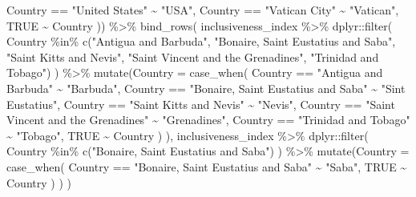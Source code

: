 \documentclass[
]{krantz}
\makeatletter
\newenvironment{Shaded}{\begin{snugshade}}{\end{snugshade}}
\newcommand{\AttributeTok}[1]{\textcolor[rgb]{0.61,0.61,0.61}{#1}}
\newcommand{\ConstantTok}[1]{\textcolor[rgb]{0,0,0}{#1}}
\newcommand{\FunctionTok}[1]{\textcolor[rgb]{0,0,0}{#1}}
\newcommand{\NormalTok}[1]{#1}
\newcommand{\SpecialCharTok}[1]{\textcolor[rgb]{0,0,0}{#1}}
\newcommand{\StringTok}[1]{\textcolor[rgb]{0.5,0.5,0.5}{#1}}
\newenvironment{kframe}{%
\medskip{}
\setlength{\fboxsep}{.8em}
 \def\at@end@of@kframe{}%
 \ifinner\ifhmode%
  \def\at@end@of@kframe{\end{minipage}}%
  \begin{minipage}{\columnwidth}%
 \fi\fi%
 \def\FrameCommand##1{\hskip\@totalleftmargin \hskip-\fboxsep
 \colorbox{shadecolor}{##1}\hskip-\fboxsep
     \hskip-\linewidth \hskip-\@totalleftmargin \hskip\columnwidth}%
 \MakeFramed {\advance\hsize-\width
   \@totalleftmargin\z@ \linewidth\hsize
   \@setminipage}}%
 {\par\unskip\endMakeFramed%
 \at@end@of@kframe}
\renewenvironment{Shaded}{\begin{kframe}}{\end{kframe}}
\makeatother
\begin{document}
\begin{Shaded}
\begin{Highlighting}[]
\NormalTok{    Country }\SpecialCharTok{==} \StringTok{"United States"} \SpecialCharTok{\textasciitilde{}} \StringTok{"USA"}\NormalTok{,}
\NormalTok{    Country }\SpecialCharTok{==} \StringTok{"Vatican City"} \SpecialCharTok{\textasciitilde{}} \StringTok{"Vatican"}\NormalTok{,}
    \ConstantTok{TRUE} \SpecialCharTok{\textasciitilde{}}\NormalTok{ Country}
\NormalTok{  )) }\SpecialCharTok{\%\textgreater{}\%}
  \FunctionTok{bind\_rows}\NormalTok{(}
\NormalTok{    inclusiveness\_index }\SpecialCharTok{\%\textgreater{}\%}\NormalTok{ dplyr}\SpecialCharTok{::}\FunctionTok{filter}\NormalTok{(}
\NormalTok{      Country }\SpecialCharTok{\%in\%} \FunctionTok{c}\NormalTok{(}\StringTok{"Antigua and Barbuda"}\NormalTok{, }\StringTok{"Bonaire, Saint Eustatius and Saba"}\NormalTok{,}
                     \StringTok{"Saint Kitts and Nevis"}\NormalTok{, }\StringTok{"Saint Vincent and the Grenadines"}\NormalTok{,}
                     \StringTok{"Trinidad and Tobago"}\NormalTok{)}
\NormalTok{    ) }\SpecialCharTok{\%\textgreater{}\%} \FunctionTok{mutate}\NormalTok{(}\AttributeTok{Country =} \FunctionTok{case\_when}\NormalTok{(}
\NormalTok{      Country }\SpecialCharTok{==} \StringTok{"Antigua and Barbuda"} \SpecialCharTok{\textasciitilde{}} \StringTok{"Barbuda"}\NormalTok{,}
\NormalTok{      Country }\SpecialCharTok{==} \StringTok{"Bonaire, Saint Eustatius and Saba"} \SpecialCharTok{\textasciitilde{}} \StringTok{"Sint Eustatius"}\NormalTok{,}
\NormalTok{      Country }\SpecialCharTok{==} \StringTok{"Saint Kitts and Nevis"} \SpecialCharTok{\textasciitilde{}} \StringTok{"Nevis"}\NormalTok{,}
\NormalTok{      Country }\SpecialCharTok{==} \StringTok{"Saint Vincent and the Grenadines"} \SpecialCharTok{\textasciitilde{}} \StringTok{"Grenadines"}\NormalTok{,}
\NormalTok{      Country }\SpecialCharTok{==} \StringTok{"Trinidad and Tobago"} \SpecialCharTok{\textasciitilde{}} \StringTok{"Tobago"}\NormalTok{,}
      \ConstantTok{TRUE} \SpecialCharTok{\textasciitilde{}}\NormalTok{ Country}
\NormalTok{      )}
\NormalTok{    ),}
\NormalTok{    inclusiveness\_index }\SpecialCharTok{\%\textgreater{}\%}\NormalTok{ dplyr}\SpecialCharTok{::}\FunctionTok{filter}\NormalTok{(}
\NormalTok{      Country }\SpecialCharTok{\%in\%} \FunctionTok{c}\NormalTok{(}\StringTok{"Bonaire, Saint Eustatius and Saba"}\NormalTok{)}
\NormalTok{    ) }\SpecialCharTok{\%\textgreater{}\%} \FunctionTok{mutate}\NormalTok{(}\AttributeTok{Country =} \FunctionTok{case\_when}\NormalTok{(}
\NormalTok{      Country }\SpecialCharTok{==} \StringTok{"Bonaire, Saint Eustatius and Saba"} \SpecialCharTok{\textasciitilde{}} \StringTok{"Saba"}\NormalTok{,}
      \ConstantTok{TRUE} \SpecialCharTok{\textasciitilde{}}\NormalTok{ Country}
\NormalTok{      )}
\NormalTok{    )}
\NormalTok{  ) }


\end{Highlighting}
\end{Shaded}
\end{document}
